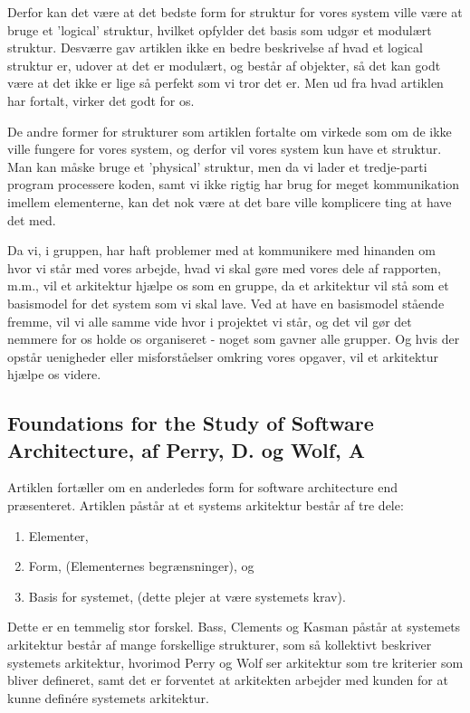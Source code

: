 \documentclass[10pt,a4paper,danish]{article}
\begin{document}
Derfor kan det være at det bedste form for struktur for vores system ville være at bruge et 'logical' struktur, hvilket opfylder det basis som udgør et modulært struktur. Desværre gav artiklen ikke en bedre beskrivelse af hvad et logical struktur er, udover at det er modulært, og består af objekter, så det kan godt være at det ikke er lige så perfekt som vi tror det er. Men ud fra hvad artiklen har fortalt, virker det godt for os.

De andre former for strukturer som artiklen fortalte om virkede som om de ikke ville fungere for vores system, og derfor vil vores system kun have et struktur. Man kan måske bruge et 'physical' struktur, men da vi lader et tredje-parti program processere koden, samt vi ikke rigtig har brug for meget kommunikation imellem elementerne, kan det nok være at det bare ville komplicere ting at have det med.

Da vi, i gruppen, har haft problemer med at kommunikere med hinanden om hvor vi står med vores arbejde, hvad vi skal gøre med vores dele af rapporten, m.m., vil et arkitektur hjælpe os som en gruppe, da et arkitektur vil stå som et basismodel for det system som vi skal lave. Ved at have en basismodel stående fremme, vil vi alle samme vide hvor i projektet vi står, og det vil gør det nemmere for os holde os organiseret - noget som gavner alle grupper. Og hvis der opstår uenigheder eller misforståelser omkring vores opgaver, vil et arkitektur hjælpe os videre.

\subsection{Foundations for the Study of Software Architecture, af Perry, D. og Wolf, A}
Artiklen fortæller om en anderledes form for software architecture end præsenteret. Artiklen påstår at et systems arkitektur består af tre dele: 
\begin{enumerate}
\item Elementer,
\item Form, (Elementernes begrænsninger), og
\item Basis for systemet, (dette plejer at være systemets krav).
\end{enumerate}
Dette er en temmelig stor forskel. Bass, Clements og Kasman påstår at systemets arkitektur består af mange forskellige strukturer, som så kollektivt beskriver systemets arkitektur, hvorimod Perry og Wolf ser arkitektur som tre kriterier som bliver defineret, samt det er forventet at arkitekten arbejder med kunden for at kunne definére systemets arkitektur. 
\end{document}
